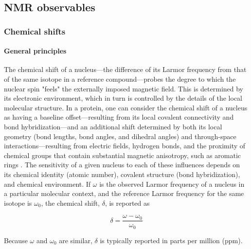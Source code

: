 \documentclass[9pt,review,pubversion]{livecoms}
\begin{document}
\subsection{NMR observables}
\label{sub:nmr_obs}

\subsubsection{Chemical shifts}
\label{sub2:chem_shift}

\paragraph{General principles}

The chemical shift of a nucleus---the difference of its Larmor frequency from that of the same isotope in a reference compound---probes the degree to which the nuclear spin "feels" the externally imposed magnetic field.
This is determined by its electronic environment, which in turn is controlled by the details of the local molecular structure.
In a protein, one can consider the chemical shift of a nucleus as having a baseline offset---resulting from its local covalent connectivity and bond hybridization---and an additional shift determined by both its local geometry (bond lengths, bond angles, and dihedral angles) and through-space interactions---resulting from electric fields, hydrogen bonds, and the proximity of chemical groups that contain substantial magnetic anisotropy, such as aromatic rings \cite{wishart_12_1994,wishart_1_2002,neal_rapid_2003}.
The sensitivity of a given nucleus to each of these influences depends on its chemical identity (atomic number), covalent structure (bond hybridization), and chemical environment.
If $\omega$ is the observed Larmor frequency of a nucleus in a particular molecular context, and the reference Larmor frequency for the same isotope is $\omega_0$, the chemical shift, $\delta$, is reported as

\begin{equation}
\label{eqn:chem_shift}
\delta = \frac {\omega - \omega_0} {\omega_0}
\end{equation}

\noindent Because $\omega$ and $\omega_0$ are similar, $\delta$ is typically reported in parts per million (ppm).
\end{document}
